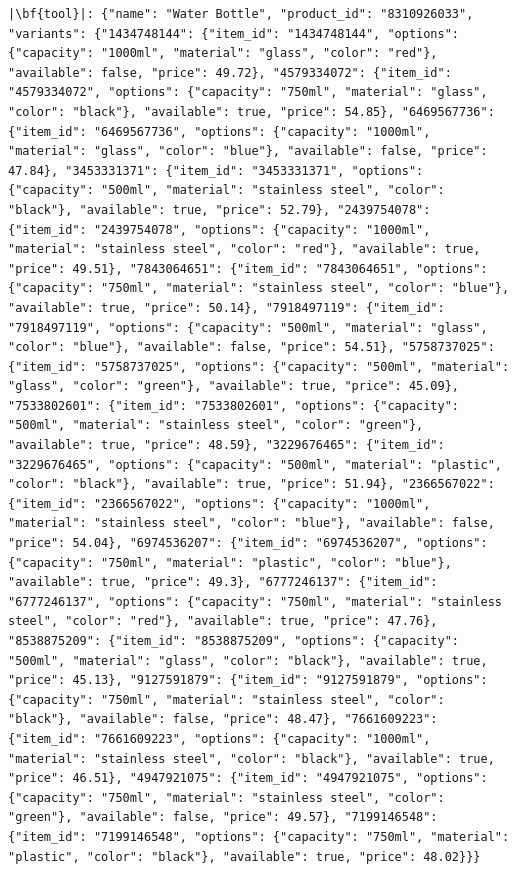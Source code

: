 \begin{longlisting}
\begin{verbatim}
|\bf{tool}|: {"name": "Water Bottle", "product_id": "8310926033", "variants": {"1434748144": {"item_id": "1434748144", "options": {"capacity": "1000ml", "material": "glass", "color": "red"}, "available": false, "price": 49.72}, "4579334072": {"item_id": "4579334072", "options": {"capacity": "750ml", "material": "glass", "color": "black"}, "available": true, "price": 54.85}, "6469567736": {"item_id": "6469567736", "options": {"capacity": "1000ml", "material": "glass", "color": "blue"}, "available": false, "price": 47.84}, "3453331371": {"item_id": "3453331371", "options": {"capacity": "500ml", "material": "stainless steel", "color": "black"}, "available": true, "price": 52.79}, "2439754078": {"item_id": "2439754078", "options": {"capacity": "1000ml", "material": "stainless steel", "color": "red"}, "available": true, "price": 49.51}, "7843064651": {"item_id": "7843064651", "options": {"capacity": "750ml", "material": "stainless steel", "color": "blue"}, "available": true, "price": 50.14}, "7918497119": {"item_id": "7918497119", "options": {"capacity": "500ml", "material": "glass", "color": "blue"}, "available": false, "price": 54.51}, "5758737025": {"item_id": "5758737025", "options": {"capacity": "500ml", "material": "glass", "color": "green"}, "available": true, "price": 45.09}, "7533802601": {"item_id": "7533802601", "options": {"capacity": "500ml", "material": "stainless steel", "color": "green"}, "available": true, "price": 48.59}, "3229676465": {"item_id": "3229676465", "options": {"capacity": "500ml", "material": "plastic", "color": "black"}, "available": true, "price": 51.94}, "2366567022": {"item_id": "2366567022", "options": {"capacity": "1000ml", "material": "stainless steel", "color": "blue"}, "available": false, "price": 54.04}, "6974536207": {"item_id": "6974536207", "options": {"capacity": "750ml", "material": "plastic", "color": "blue"}, "available": true, "price": 49.3}, "6777246137": {"item_id": "6777246137", "options": {"capacity": "750ml", "material": "stainless steel", "color": "red"}, "available": true, "price": 47.76}, "8538875209": {"item_id": "8538875209", "options": {"capacity": "500ml", "material": "glass", "color": "black"}, "available": true, "price": 45.13}, "9127591879": {"item_id": "9127591879", "options": {"capacity": "750ml", "material": "stainless steel", "color": "black"}, "available": false, "price": 48.47}, "7661609223": {"item_id": "7661609223", "options": {"capacity": "1000ml", "material": "stainless steel", "color": "black"}, "available": true, "price": 46.51}, "4947921075": {"item_id": "4947921075", "options": {"capacity": "750ml", "material": "stainless steel", "color": "green"}, "available": false, "price": 49.57}, "7199146548": {"item_id": "7199146548", "options": {"capacity": "750ml", "material": "plastic", "color": "black"}, "available": true, "price": 48.02}}}



\end{verbatim}
\end{longlisting}
